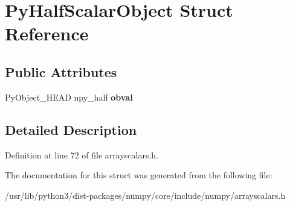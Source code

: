 \hypertarget{structPyHalfScalarObject}{}\section{Py\+Half\+Scalar\+Object Struct Reference}
\label{structPyHalfScalarObject}
\subsection*{Public Attributes}
\begin{DoxyCompactItemize}
\item 
Py\+Object\+\_\+\+H\+E\+AD npy\+\_\+half {\bfseries obval}\hypertarget{structPyHalfScalarObject_a5841dce6e3b8e487e79805423e06a620}{}\label{structPyHalfScalarObject_a5841dce6e3b8e487e79805423e06a620}

\end{DoxyCompactItemize}


\subsection{Detailed Description}


Definition at line 72 of file arrayscalars.\+h.



The documentation for this struct was generated from the following file\+:\begin{DoxyCompactItemize}
\item 
/usr/lib/python3/dist-\/packages/numpy/core/include/numpy/arrayscalars.\+h\end{DoxyCompactItemize}
